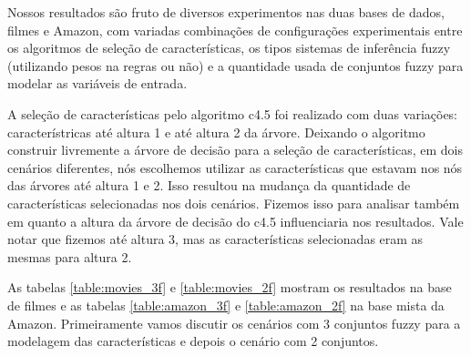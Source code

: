 \documentclass[template.tex]{subfiles}
\begin{document}
Nossos resultados são fruto de diversos experimentos nas duas bases de dados, filmes e Amazon, com variadas combinações de configurações experimentais entre os algoritmos de seleção de características, os tipos sistemas de inferência fuzzy (utilizando pesos na regras ou não) e a quantidade usada de conjuntos fuzzy para modelar as variáveis de entrada. 

A seleção de características pelo algoritmo c4.5 foi realizado com duas variações: característricas até altura 1 e até altura 2 da árvore. Deixando o algoritmo construir livremente a árvore de decisão para a seleção de características, em dois cenários diferentes, nós escolhemos utilizar as características que estavam nos nós das árvores até altura 1 e 2. Isso resultou na mudança da quantidade de características selecionadas nos dois cenários. Fizemos isso para analisar também em quanto a altura da árvore de decisão do c4.5 influenciaria nos resultados. Vale notar que fizemos até altura 3, mas as características selecionadas eram as mesmas para altura 2. 

As tabelas \ref{table:movies_3f} e \ref{table:movies_2f} mostram os resultados na base de filmes e as tabelas \ref{table:amazon_3f} e \ref{table:amazon_2f} na base mista da Amazon. Primeiramente vamos discutir os cenários com 3 conjuntos fuzzy para a modelagem das características e depois o cenário com 2 conjuntos.
\end{document}
